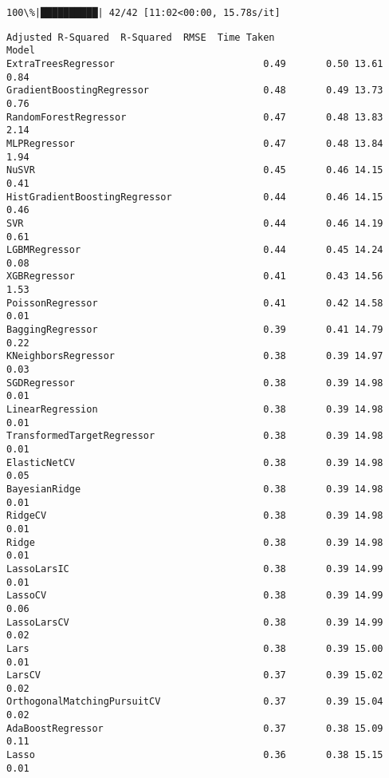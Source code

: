 \documentclass[11pt]{article}
\begin{document}
    \begin{Verbatim}[commandchars=\\\{\}]
100\%|██████████| 42/42 [11:02<00:00, 15.78s/it]
    \end{Verbatim}

    \begin{Verbatim}[commandchars=\\\{\}]
                               Adjusted R-Squared  R-Squared  RMSE  Time Taken
Model
ExtraTreesRegressor                          0.49       0.50 13.61        0.84
GradientBoostingRegressor                    0.48       0.49 13.73        0.76
RandomForestRegressor                        0.47       0.48 13.83        2.14
MLPRegressor                                 0.47       0.48 13.84        1.94
NuSVR                                        0.45       0.46 14.15        0.41
HistGradientBoostingRegressor                0.44       0.46 14.15        0.46
SVR                                          0.44       0.46 14.19        0.61
LGBMRegressor                                0.44       0.45 14.24        0.08
XGBRegressor                                 0.41       0.43 14.56        1.53
PoissonRegressor                             0.41       0.42 14.58        0.01
BaggingRegressor                             0.39       0.41 14.79        0.22
KNeighborsRegressor                          0.38       0.39 14.97        0.03
SGDRegressor                                 0.38       0.39 14.98        0.01
LinearRegression                             0.38       0.39 14.98        0.01
TransformedTargetRegressor                   0.38       0.39 14.98        0.01
ElasticNetCV                                 0.38       0.39 14.98        0.05
BayesianRidge                                0.38       0.39 14.98        0.01
RidgeCV                                      0.38       0.39 14.98        0.01
Ridge                                        0.38       0.39 14.98        0.01
LassoLarsIC                                  0.38       0.39 14.99        0.01
LassoCV                                      0.38       0.39 14.99        0.06
LassoLarsCV                                  0.38       0.39 14.99        0.02
Lars                                         0.38       0.39 15.00        0.01
LarsCV                                       0.37       0.39 15.02        0.02
OrthogonalMatchingPursuitCV                  0.37       0.39 15.04        0.02
AdaBoostRegressor                            0.37       0.38 15.09        0.11
Lasso                                        0.36       0.38 15.15        0.01

\end{Verbatim}
\end{document}
